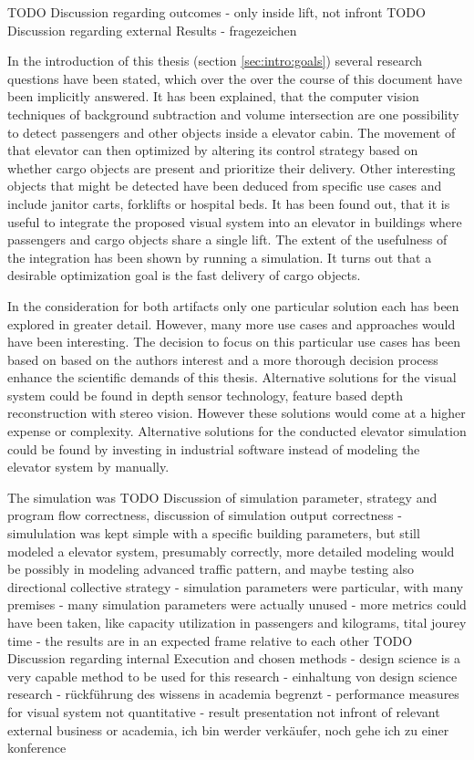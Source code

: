 TODO Discussion regarding outcomes
- only inside lift, not infront
TODO Discussion regarding external Results 
- fragezeichen

In the introduction of this thesis (section \ref{sec:intro:goals}) several research questions have been stated,
which over the over the course of this document have been implicitly answered.
It has been explained, that the computer vision techniques of background subtraction and volume intersection are one possibility to detect passengers and other objects inside a elevator cabin. The movement of that elevator can then optimized by altering its control strategy based on whether cargo objects are present and prioritize their delivery.
Other interesting objects that might be detected have been deduced from specific use cases and include janitor carts, forklifts or hospital beds.
It has been found out, 
that it  is useful to integrate the proposed visual system into an elevator in buildings where passengers and cargo objects share a single lift.
The extent of the usefulness of the integration has been shown by running a simulation. 
It turns out that a desirable optimization goal is the fast delivery of cargo objects.

In the consideration for both artifacts only one particular solution each has been explored in greater detail.
However, many more use cases and approaches would have been interesting.
The decision to focus on this particular use cases has been based on based on the authors interest and a more thorough decision process enhance the scientific demands of this thesis.
Alternative solutions for the visual system could be found in depth sensor technology, feature based depth reconstruction with stereo vision.
However these solutions would come at a higher expense or complexity.
Alternative solutions for the conducted elevator simulation could be found by investing in industrial software instead of modeling the elevator system by manually. 

The simulation was 
TODO Discussion of simulation parameter, strategy and program flow correctness, discussion of simulation output correctness
- simululation was kept simple with a specific building parameters, but still modeled a elevator system, presumably correctly, more detailed modeling would be possibly in modeling advanced traffic pattern, and maybe testing also directional collective strategy
- simulation parameters were particular, with many premises
- many simulation parameters were actually unused
- more metrics could have been taken, like capacity utilization in passengers and kilograms, tital jourey time
- the results are in an expected frame relative to each other
TODO  Discussion regarding internal Execution and chosen methods 
- design science is a very capable method to be used for this research
- einhaltung von design science research - rückführung des wissens in academia begrenzt
- performance measures for visual system not quantitative
- result presentation not infront of relevant external business or academia, ich bin werder verkäufer, noch gehe ich zu einer konference

